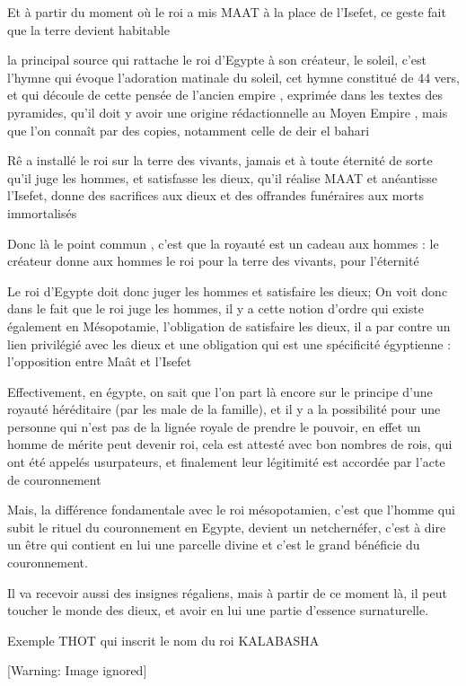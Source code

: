 \documentclass[a4paper,10pt]{article}
\begin{document}
\begin{itemize}
Et  à partir du moment où le roi a mis MAAT à la place de
l'Isefet, ce geste fait que la terre devient habitable

la principal source qui rattache le roi d'Egypte à son
créateur, le soleil, c'est l'hymne
qui évoque l'adoration matinale du soleil, cet hymne
constitué de 44 vers, et qui découle de cette pensée de
l'ancien empire , exprimée dans les textes des
pyramides, qu'il doit y avoir une origine
rédactionnelle au Moyen Empire , mais que l'on connaît
par des copies, notamment celle de deir el bahari

Rê a installé le roi sur la terre des vivants,  jamais et à toute
éternité de sorte qu'il juge les hommes, et satisfasse
les dieux, qu'il réalise MAAT et anéantisse
l'Isefet, donne des sacrifices aux dieux et des
offrandes funéraires aux morts immortalisés

Donc là le point commun , c'est que la royauté est un
cadeau aux hommes : le créateur donne aux hommes le roi pour la terre
des vivants, pour l'éternité

Le roi d'Egypte doit donc juger les hommes et
satisfaire les dieux; On voit donc dans le fait que le roi juge les
hommes, il y a cette notion d'ordre qui existe
également en Mésopotamie, l'obligation de satisfaire
les dieux,  il a par contre un lien privilégié avec les dieux et une
obligation qui est une spécificité égyptienne :
l'opposition entre Maât et l'Isefet

Effectivement, en égypte, on sait que l'on part là
encore sur le principe d'une royauté héréditaire (par
les male de la famille), et il y a la possibilité pour une personne qui
n'est pas de la lignée royale de prendre le pouvoir, 
en effet un homme de mérite peut devenir roi, cela est attesté avec bon
nombres de rois, qui ont été appelés usurpateurs, et finalement leur
légitimité est accordée par l'acte de couronnement

Mais, la différence fondamentale avec le roi mésopotamien,
c'est que l'homme qui subit le rituel
du couronnement en Egypte, devient un netchernéfer,
c'est à dire un  être qui contient en lui une parcelle
divine et c'est le grand bénéficie du couronnement.

Il va recevoir aussi des insignes régaliens, mais à partir de ce moment
là, il peut toucher le monde des dieux, et avoir en lui une partie
d'essence surnaturelle.

Exemple THOT qui inscrit le nom du roi KALABASHA

  [Warning: Image ignored] %
 


\end{itemize}
\end{document}

